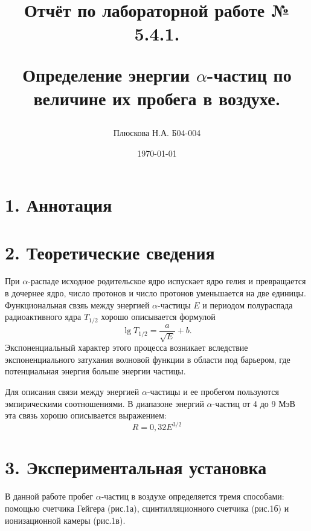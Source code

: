 \documentclass[a4paper,12pt]{report}
\title{Отчёт по лабораторной работе № 5.4.1. 

Определение энергии $\alpha$-частиц по величине их пробега в воздухе.}
\author{Плюскова Н.А. Б04-004 }
\date{\today}
\begin{document}
\maketitle
\section*{1. Аннотация}



\section*{2. Теоретические сведения}
	При $\alpha$-распаде исходное родительское ядро испускает ядро гелия и превращается в дочернее ядро, число протонов и число протонов уменьшается на две единицы. Функциональная свзяь между энергией $\alpha$-частицы $E$ и периодом полураспада радиоактивного ядра $T_{1/2}$ хорошо описывается формулой
	\begin{equation*}
		 \lg T_{1/2} = \frac{a}{\sqrt{E}} + b.
	\end{equation*}
	Экспоненциальный характер этого процесса возникает вследствие экспоненциального затухания волновой функции в области под барьером, где потенциальная энергия больше энергии частицы.
	
	Для описания связи между энергией $\alpha$-частицы и ее пробегом пользуются эмпирическими соотношениями. В диапазоне энергий $\alpha$-частиц от 4 до 9 МэВ эта связь хорошо описывается выражением:
	\begin{equation*}
		\label{eq:R(E)}
		R = 0,32E^{3/2}
	\end{equation*}
\section*{3. Экспериментальная установка}
В данной работе пробег $\alpha$-частиц в воздухе определяется тремя способами: помощью счетчика Гейгера (рис.1а), сцинтилляционного счетчика (рис.1б) и ионизационной камеры (рис.1в).
	
\end{document}
